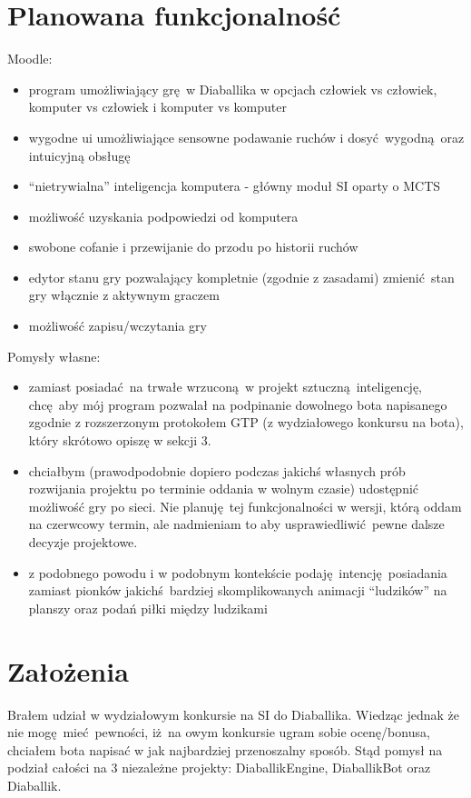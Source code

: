 \documentclass[a4paper,12pt]{article}
\begin{document}
\section{Planowana funkcjonalność}
Moodle:
\begin{itemize}
\item program umożliwiający grę w Diaballika w opcjach człowiek vs człowiek, komputer vs człowiek i komputer vs komputer
\item wygodne ui umożliwiające sensowne podawanie ruchów i dosyć wygodną oraz intuicyjną obsługę
\item ``nietrywialna'' inteligencja komputera - główny moduł SI oparty o MCTS
\item możliwość uzyskania podpowiedzi od komputera
\item swobone cofanie i przewijanie do przodu po historii ruchów
\item edytor stanu gry pozwalający kompletnie (zgodnie z zasadami) zmienić stan gry włącznie z aktywnym graczem
\item możliwość zapisu/wczytania gry
\end{itemize}
Pomysły własne:
\begin{itemize}
\item zamiast posiadać na trwałe wrzuconą w projekt sztuczną inteligencję, chcę aby mój program pozwalał na podpinanie dowolnego bota napisanego
zgodnie z rozszerzonym protokołem GTP (z wydziałowego konkursu na bota), który skrótowo opiszę w sekcji 3.
\item chciałbym (prawodpodobnie dopiero podczas jakichś własnych prób rozwijania projektu po terminie oddania w wolnym czasie) udostępnić możliwość
gry po sieci. Nie planuję tej funkcjonalności w wersji, którą oddam na czerwcowy termin, ale nadmieniam to aby usprawiedliwić pewne dalsze decyzje 
projektowe.
\item z podobnego powodu i w podobnym kontekście podaję intencję posiadania zamiast pionków jakichś bardziej skomplikowanych animacji ``ludzików'' na
planszy oraz podań piłki między ludzikami
\end{itemize}

\section{Założenia}
Brałem udział w wydziałowym konkursie na SI do Diaballika. Wiedząc jednak że nie mogę mieć pewności, iż na owym konkursie ugram sobie ocenę/bonusa,
chciałem bota napisać w jak najbardziej przenoszalny sposób. Stąd pomysł na podział całości na 3 niezależne projekty: DiaballikEngine, DiaballikBot
oraz Diaballik. 
\end{document}
